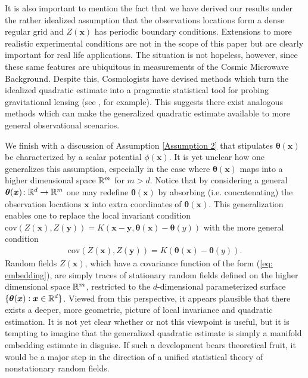 \documentclass[10pt,noinfoline]{imsart}
\newcommand{\bs}{\boldsymbol}
\begin{document}
It is also important to mention the fact that we have derived our results under the rather idealized assumption that the observations locations form a dense regular grid and $Z(\bs x)$ has periodic boundary conditions. Extensions to more realistic experimental conditions are not in the scope of this paper but are clearly important for real life applications. The situation is not hopeless, however, since these same features are ubiquitous in measurements of the Cosmic Microwave Background. Despite this, Cosmologists have devised methods which turn the idealized quadratic estimate into a pragmatic statistical tool for probing gravitational lensing (see \cite{namikawa2013bias,van2012measurement,planck2013lensing,planck2015lensing}, for example). This suggests there exist analogous methods which can make the generalized quadratic estimate available to more general observational scenarios.


We finish with a discussion of Assumption \ref{Assumption 2} that stipulates $\bs \theta(\bs x)$ be characterized by a scalar potential $\phi(\bs x)$.  It is yet unclear how one generalizes this assumption, especially in the case where $\bs \theta(\bs x)$ maps into a higher dimensional space $\Bbb R^m$ for $m>d$. Notice that by considering a general $\bs \theta(\bs x)\colon\Bbb R^d \rightarrow \Bbb R^m$ one may redefine $\bs\theta(\bs x)$ by absorbing (i.e. concatenating) the observation locations $\bs x$ into extra coordinates of $\bs \theta(\bs x)$. This generalization enables one to replace the local invariant condition $\text{cov}(Z(\bs x), Z(\bs y))=K(\bs x-\bs y, \bs\theta(\bs x) - \bs \theta(y))$ with the more general condition 
\begin{align}
\label{eq: embedding}
\text{cov}(Z(\bs x), Z(\bs y))=K(\bs\theta(\bs x) - \bs \theta(y)).
\end{align}
Random fields $Z(\bs x)$, which have a covariance function of the form (\ref{eq: embedding}), are simply traces of stationary random fields defined on the higher dimensional space $\Bbb R^m$, restricted to the $d$-dimensional parameterized surface $\{\bs\theta(\bs x):\bs x\in\Bbb R^d\}$. Viewed from this perspective, it appears plausible that there exists a deeper, more geometric, picture of local invariance and quadratic estimation. It is not yet clear whether or not this viewpoint is useful, but it is tempting to imagine that the generalized quadratic estimate is simply a manifold embedding estimate in disguise. If such a development bears theoretical fruit, it would be a major step in the direction of a unified statistical theory of nonstationary random fields. 
\end{document}
